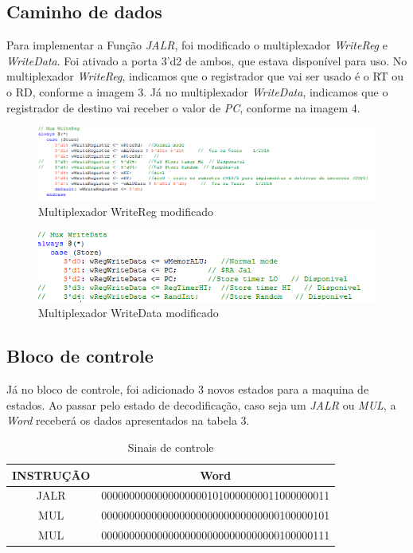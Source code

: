 \documentclass[12pt]{article}
\begin{document}
\subsection{Caminho de dados}
\label{subsec:datapath}

Para implementar a Função \textit{JALR}, foi modificado o multiplexador \textit{WriteReg} e \textit{WriteData}. Foi ativado a porta 3'd2 de ambos, que estava disponível para uso. No multiplexador \textit{WriteReg}, indicamos que o registrador que vai ser usado é o RT ou o RD, conforme a imagem 3. Já no multiplexador \textit{WriteData}, indicamos que o registrador de destino vai receber o valor de \textit{PC}, conforme na imagem 4.    

\begin{figure}[H]
	\flushleft
	\includegraphics[width=1\textwidth]{MUXWR.png}
	\caption{Multiplexador WriteReg modificado}
	\label{fig:pest}
\end{figure}

\begin{figure}[H]
	\flushleft
	\includegraphics[width=1\textwidth]{MUXWD.png}
	\caption{Multiplexador WriteData modificado}
	\label{fig:pest}
\end{figure}

\subsection{Bloco de controle}
\label{subsec:control}

Já no bloco de controle, foi adicionado 3 novos estados para a maquina de estados. Ao passar pelo estado de decodificação, caso seja um \textit{JALR} ou \textit{MUL}, a \textit{Word} receberá os dados apresentados na tabela 3.

\begin{table}[H]
	\centering
	\begin{tabular}{|c|c|}
		\hline
		INSTRUÇÃO & Word \\\hline
		JALR & 00000000000000000001010000000011000000011 \\\hline
	    MUL  & 00000000000000000000000000000000100000101 \\\hline
	    MUL  & 00000000000000000000000000000000100000111 \\\hline
	\end{tabular}
	\caption{Sinais de controle}
	\label{tab:mul}
\end{table}
\end{document}

